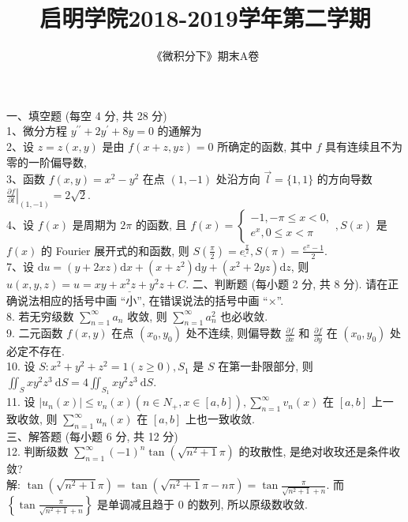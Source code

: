 \documentclass[a4paper,11pt,UTF8]{article}
\title{启明学院2018-2019学年第二学期}
\author{《微积分下》期末A卷}
\begin{document}
\maketitle

\noindent 一、填空题 (每空 4 分, 共 28 分)\\
1、微分方程 $y^{\prime \prime}+2 y^{\prime}+8 y=0$ 的通解为\\
2、设 $z=z(x, y)$ 是由 $f(x+z, y z)=0$ 所确定的函数, 其中 $f$ 具有连续且不为零的一阶偏导数,\\
3、函数 $f(x, y)=x^2-y^2$ 在点 $(1,-1)$ 处沿方向 $\vec{l}=\{1,1\}$ 的方向导数 $\left.\frac{\partial f}{\partial l}\right|_{(1,-1)}=2 \sqrt{2}$.\\
4、设 $f(x)$ 是周期为 $2 \pi$ 的函数, 且 $f(x)=\left\{\begin{array}{l}-1,-\pi \leq x<0, \\ e^x, 0 \leq x<\pi\end{array}, S(x)\right.$ 是 $f(x)$ 的 Fourier 展开式的和函数, 则 $S\left(\frac{\pi}{2}\right)=\underline{e^{\frac{\pi}{2}}}, S(\pi)=\frac{e^\pi-1}{2}$.\\
7、设 $\mathrm{d} u=(y+2 x z) \mathrm{d} x+\left(x+z^2\right) \mathrm{d} y+\left(x^2+2 y z\right) \mathrm{d} z$, 则 $u(x, y, z)=\underline{u=x y+x^2 z+y^2 z+C}$.
二、判断题 (每小题 2 分, 共 8 分). 请在正确说法相应的括号中画 “小”, 在错误说法的括号中画 “×”.\\
8. 若无穷级数 $\sum_{n=1}^{\infty} a_n$ 收敛, 则 $\sum_{n=1}^{\infty} a_n^2$ 也必收敛.\\
9. 二元函数 $f(x, y)$ 在点 $\left(x_0, y_0\right)$ 处不连续, 则偏导数 $\frac{\partial f}{\partial x}$ 和 $\frac{\partial f}{\partial y}$ 在 $\left(x_0, y_0\right)$ 处必定不存在.\\
10. 设 $S: x^2+y^2+z^2=1(z \geq 0), S_1$ 是 $S$ 在第一卦限部分, 则 $\iint_S x y^2 z^3 \mathrm{~d} S=4 \iint_{S_1} x y^2 z^3 \mathrm{~d} S$.\\
11. 设 $\left|u_n(x)\right| \leq v_n(x)\left(n \in N_{+}, x \in[a, b]\right), \sum_{n=1}^{\infty} v_n(x)$ 在 $[a, b]$ 上一致收敛, 则 $\sum_{n=1}^{\infty} u_n(x)$ 在 $[a, b]$ 上也一致收敛.\\
三、解答题 (每小题 6 分, 共 12 分)\\
12. 判断级数 $\sum_{n=1}^{\infty}(-1)^n \tan \left(\sqrt{n^2+1} \pi\right)$ 的玫散性, 是绝对收玫还是条件收敛?\\
解: $\tan \left(\sqrt{n^2+1} \pi\right)=\tan \left(\sqrt{n^2+1} \pi-n \pi\right)=\tan \frac{\pi}{\sqrt{n^2+1}+n}$.
而 $\left\{\tan \frac{\pi}{\sqrt{n^2+1}+n}\right\}$ 是单调减且趋于 0 的数列, 所以原级数收敛.
\end{document}
